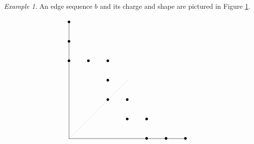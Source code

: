 \documentclass{amsart}
\theoremstyle{remark}
\newtheorem{ex}[thm]{Example}
\numberwithin{thm}{section}
\numberwithin{equation}{section}
\begin{document}
\begin{ex} An edge sequence $b$ and its charge and shape are pictured in Figure \ref{F:edge sequence}.
\begin{figure}
\label{F:edge sequence}
\[
\begin{tikzpicture}
\node at (0,6) {$\bullet$};
\node at (0,5) {$\bullet$};
\node at (0,4) {$\bullet$};
\node at (1,4) {$\bullet$};
\node at (2,4) {$\bullet$};
\node at (2,3) {$\bullet$};
\node at (2,2) {$\bullet$};
\node at (3,2) {$\bullet$};
\node at (3,1) {$\bullet$};
\node at (4,1) {$\bullet$};
\node at (4,0) {$\bullet$};
\node at (5,0) {$\bullet$};
\node at (6,0) {$\bullet$};

\draw (0,6) -- (0,0) -- (6,0);
\coordinate (zf) at (0,6);
\coordinate (ze) at (0,5);
\coordinate (zd) at (0,4); 
\coordinate (ad) at (1,4);
\coordinate (bd) at (2,4);
\coordinate (bc) at (2,3);
\coordinate (bb) at (2,2);
\coordinate (cb) at (3,2);
\coordinate (ca) at (3,1);
\coordinate (da) at (4,1);
\coordinate (dz) at (4,0);
\coordinate (ez) at (5,0);
\coordinate (fz) at (6,0);

\draw[dotted] (0,0) -- (3,3);


\end{tikzpicture}\]
\end{figure}
\end{ex}
\end{document}
